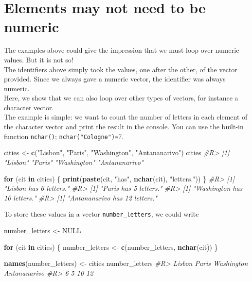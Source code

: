 \documentclass[]{book}
\newenvironment{Shaded}{}{}
\newcommand{\CommentTok}[1]{\textcolor[rgb]{0.38,0.63,0.69}{\textit{#1}}}
\newcommand{\ControlFlowTok}[1]{\textcolor[rgb]{0.00,0.44,0.13}{\textbf{#1}}}
\newcommand{\KeywordTok}[1]{\textcolor[rgb]{0.00,0.44,0.13}{\textbf{#1}}}
\newcommand{\NormalTok}[1]{#1}
\newcommand{\OtherTok}[1]{\textcolor[rgb]{0.00,0.44,0.13}{#1}}
\newcommand{\StringTok}[1]{\textcolor[rgb]{0.25,0.44,0.63}{#1}}
\theoremstyle{definition}
\theoremstyle{definition}
\theoremstyle{definition}
\theoremstyle{remark}
\begin{document}
\hypertarget{elements-may-not-need-to-be-numeric}{%
\section{Elements may not need to be
numeric}\label{elements-may-not-need-to-be-numeric}}

The examples above could give the impression that we must loop over
numeric values. But it is not so!\\
The identifiers above simply took the values, one after the other, of
the vector provided. Since we always gave a numeric vector, the
identifier was always numeric.\\
Here, we show that we can also loop over other types of vectors, for
instance a character vector.\\
The example is simple: we want to count the number of letters in each
element of the character vector and print the result in the console. You
can use the built-in function \texttt{nchar()};
\texttt{nchar("Cologne")=}7.

\begin{Shaded}
\begin{Highlighting}[]
\NormalTok{cities <-}\StringTok{ }\KeywordTok{c}\NormalTok{(}\StringTok{"Lisbon"}\NormalTok{, }\StringTok{"Paris"}\NormalTok{, }\StringTok{"Washington"}\NormalTok{, }\StringTok{"Antananarivo"}\NormalTok{)}
\NormalTok{cities}
\CommentTok{#R> [1] "Lisbon"       "Paris"        "Washington"   "Antananarivo"}

\ControlFlowTok{for}\NormalTok{ (cit }\ControlFlowTok{in}\NormalTok{ cities) \{}
  \KeywordTok{print}\NormalTok{(}\KeywordTok{paste}\NormalTok{(cit, }\StringTok{"has"}\NormalTok{, }\KeywordTok{nchar}\NormalTok{(cit), }\StringTok{"letters."}\NormalTok{))}
\NormalTok{\}}
\CommentTok{#R> [1] "Lisbon has 6 letters."}
\CommentTok{#R> [1] "Paris has 5 letters."}
\CommentTok{#R> [1] "Washington has 10 letters."}
\CommentTok{#R> [1] "Antananarivo has 12 letters."}
\end{Highlighting}
\end{Shaded}

To store these values in a vector \texttt{number\_letters}, we could
write

\begin{Shaded}
\begin{Highlighting}[]
\NormalTok{number_letters <-}\StringTok{ }\OtherTok{NULL}

\ControlFlowTok{for}\NormalTok{ (cit }\ControlFlowTok{in}\NormalTok{ cities) \{}
\NormalTok{  number_letters <-}\StringTok{ }\KeywordTok{c}\NormalTok{(number_letters, }\KeywordTok{nchar}\NormalTok{(cit)) }
\NormalTok{\}}

\KeywordTok{names}\NormalTok{(number_letters) <-}\StringTok{ }\NormalTok{cities}
\NormalTok{number_letters}
\CommentTok{#R>       Lisbon        Paris   Washington Antananarivo }
\CommentTok{#R>            6            5           10           12}
\end{Highlighting}
\end{Shaded}
\end{document}
